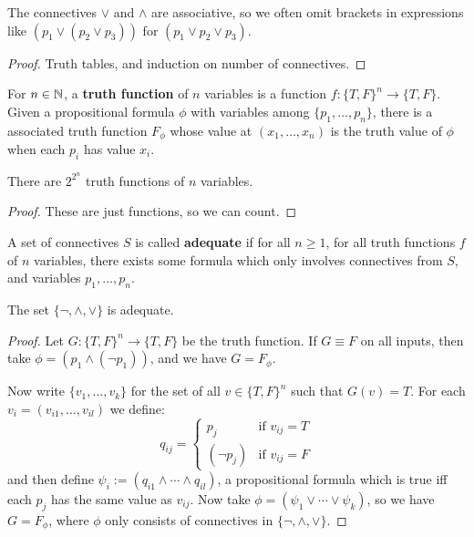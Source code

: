 \documentclass{article}
\begin{document}
\begin{lemma}
    The connectives $\vee$ and $\wedge$ are associative, so we often omit brackets in expressions like $(p_1\vee(p_2\vee p_3))$ for $(p_1\vee p_2\vee p_3)$.
    \begin{proof}
        Truth tables, and induction on number of connectives.
    \end{proof}
\end{lemma}

\begin{definition}
    For $n\in \mathbb{N}$, a \textbf{truth function} of $n$ variables is a function $f:\{T,F\}^n\rightarrow \{T,F\}$. Given a propositional formula $\phi$ with variables among $\{p_1,\ldots,p_n\}$, there is a associated truth function $F_\phi$ whose value at $(x_1,\ldots,x_n)$ is the truth value of $\phi$ when each $p_i$ has value $x_i$.
\end{definition}

\begin{lemma}
    There are $2^{2^n}$ truth functions of $n$ variables.
    \begin{proof}
        These are just functions, so we can count.
    \end{proof}
\end{lemma}

\begin{definition}
    A set of connectives $S$ is called \textbf{adequate} if for all $n\geq 1$, for all truth functions $f$ of $n$ variables, there exists some formula which only involves connectives from $S$, and variables $p_1,\ldots,p_n$.
\end{definition}

\begin{theorem}
    The set $\{\neg,\wedge,\vee\}$ is adequate.\begin{proof}
        Let $G:\{T,F\}^n\rightarrow \{T,F\}$ be the truth function. If $G\equiv F$ on all inputs, then take $\phi = (p_1\wedge(\neg p_1))$, and we have $G=F_\phi$.

        Now write $\{v_1,\ldots,v_k\}$ for the set of all $v\in\{T,F\}^n$ such that $G(v)=T$. For each $v_i=(v_{i1},\ldots,v_{il})$ we define: \[
        q_{ij} = \begin{cases}
            p_j & \text{if } v_{ij}=T\\
            (\neg p_j) & \text{if } v_{ij}=F
        \end{cases}
        \] and then define $\psi_i:= (q_{i1}\wedge \cdots \wedge q_{il})$, a propositional formula which is true iff each $p_j$ has the same value as $v_{ij}$. Now take $\phi=(\psi_1\vee \cdots \vee \psi_k)$, so we have $G=F_\phi$, where $\phi$ only consists of connectives in $\{\neg,\wedge,\vee\}$.
    \end{proof}
\end{theorem}
\end{document}

